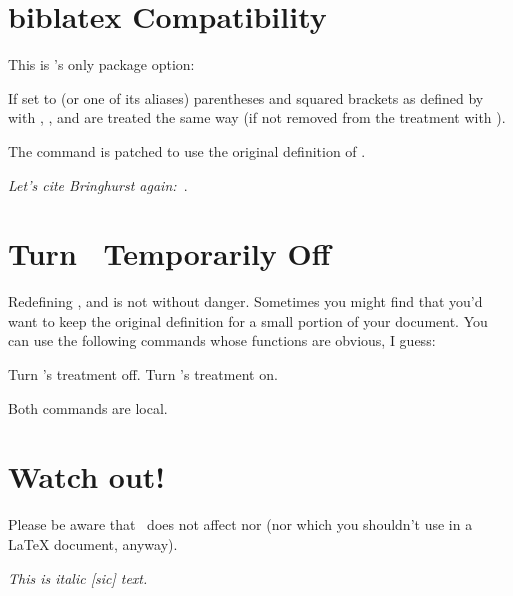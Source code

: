 \documentclass[load-preamble+]{cnltx-doc}
\begin{document}
\section{biblatex Compatibility}
This is \embrac's only package option:
\begin{options}
    If set to  (or one of its aliases) parentheses and squared
    brackets as defined by  with ,
    ,  and  are
    treated the same way (if not removed from the treatment with ).
   
    The command  is patched to use the original definition
    of .
\end{options}

\begin{example}
  \emph{Let's cite Bringhurst again:~\cite{bringhurst04}}.
\end{example}

\section{Turn \embrac\ Temporarily Off}
Redefining ,  and  is not without danger.
Sometimes you might find that you'd want to keep the original definition for a
small portion of your document.  You can use the following commands whose
functions are obvious, I guess:
\begin{commands}
    Turn \embrac's treatment off.
    Turn \embrac's treatment on.
\end{commands}
Both commands are local.

\section{Watch out!}
Please be aware that \embrac\ does not affect  nor  (nor
 which you shouldn't use in a \LaTeX{} document, anyway).
\begin{example}
  \itshape This is italic [sic] text.
\end{example}
\end{document}
